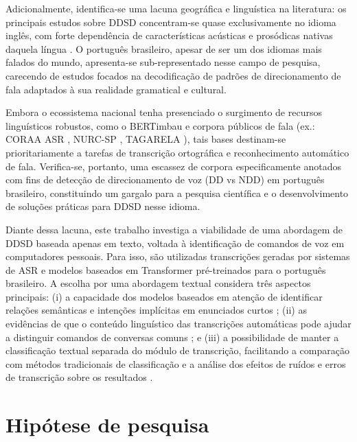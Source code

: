\documentclass[
    12pt,                %
    openright,           %
    oneside,             %
    a4paper,             %
    english,             %
    brazil               %
]{abntex2}
\begin{document}
Adicionalmente, identifica-se uma lacuna geográfica e linguística na literatura: os principais estudos sobre DDSD concentram-se quase exclusivamente no idioma inglês, com forte dependência de características acústicas e prosódicas nativas daquela língua \cite{Norouzian2019, Krishna2024}. O português brasileiro, apesar de ser um dos idiomas mais falados do mundo, apresenta-se sub-representado nesse campo de pesquisa, carecendo de estudos focados na decodificação de padrões de direcionamento de fala adaptados à sua realidade gramatical e cultural.

Embora o ecossistema nacional tenha presenciado o surgimento de recursos linguísticos robustos, como o BERTimbau \cite{Souza2020} e corpora públicos de fala (ex.: CORAA ASR \cite{CORAA2023}, NURC-SP \cite{NURCSP2025}, TAGARELA \cite{Tagarela2026}), tais bases destinam-se prioritariamente a tarefas de transcrição ortográfica e reconhecimento automático de fala. Verifica-se, portanto, uma escassez de corpora especificamente anotados com fins de detecção de direcionamento de voz (DD vs NDD) em português brasileiro, constituindo um gargalo para a pesquisa científica e o desenvolvimento de soluções práticas para DDSD nesse idioma.

Diante dessa lacuna, este trabalho investiga a viabilidade de uma abordagem de DDSD baseada apenas em texto, voltada à identificação de comandos de voz em computadores pessoais. Para isso, são utilizadas transcrições geradas por sistemas de ASR e modelos baseados em Transformer pré-treinados para o português brasileiro. A escolha por uma abordagem textual considera três aspectos principais: (i) a capacidade dos modelos baseados em atenção de identificar relações semânticas e intenções implícitas em enunciados curtos \cite{Weld2023}; (ii) as evidências de que o conteúdo linguístico das transcrições automáticas pode ajudar a distinguir comandos de conversas comuns \cite{Wagner2024, Dighe2024}; e (iii) a possibilidade de manter a classificação textual separada do módulo de transcrição, facilitando a comparação com métodos tradicionais de classificação e a análise dos efeitos de ruídos e erros de transcrição sobre os resultados \cite{Dighe2024}.


\section{Hipótese de pesquisa}
\label{sec:hipotese}
\end{document}
